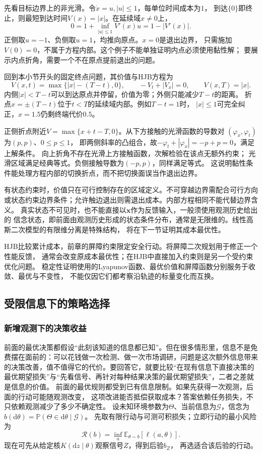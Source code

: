 先看目标边界上的非光滑。令$\dot x=u,|u|\leq1$，每单位时间成本为$1$，
到达$\{0\}$即终止，则最短到达时间$V(x)=|x|$。在延续域$x\neq0$上，
\[
  0=1+\inf_{|u|\leq1}V'(x)u=1-|V'(x)|.
\]
正侧取$u=-1$、负侧取$u=1$，均推向原点。$x=0$是退出边界，
只需施加$V(0)=0$，不属于方程内部。这个例子不能单独证明内点必须使用黏性解；
要展示内点折角，需要一个不在原点提前退出的问题。

\begin{example}[延续域内部的价值折点]
\label{ex:control-viscosity-interior-kink}
回到本小节开头的固定终点问题，其价值与HJB方程为
\[
  V(x,t)=\max\{|x|-(T-t),0\},\qquad
  -V_t+|V_x|=0,\qquad V(x,T)=|x|.
\]
内侧$|x|<T-t$可以到达原点并停留，价值为零；外侧只能减少$T-t$的距离。
折点$x=\pm(T-t)$位于$t<T$的延续域内部。例如$T-t=1$时，
$|x|\leq1$可完全纠正，$x=1.5$仍剩终端代价$0.5$。

正侧折点附近$V=\max\{x+t-T,0\}$。从下方接触的光滑函数的导数对
$(\varphi_x,\varphi_t)$为$(p,p)$、$0\leq p\leq1$，
即两侧斜率的凸组合，故$-\varphi_t+|\varphi_x|=-p+p=0$，满足上解条件。
向上折角不存在光滑上方接触函数，次解检验在该点无额外约束；
光滑区域满足经典等式。负侧接触导数为$(-p,p)$，同样满足等式。
这说明黏性条件能处理方程内部的切换折点，而不把切换面误当作退出边界。
\end{example}

有状态约束时，价值只在可行控制存在的区域定义。不可穿越边界需配合可行方向
或状态约束边界条件；允许触边退出则需退出成本。内部方程相同不能代替边界含义。
真实状态不可见时，也不能直接以$\bm x$作为反馈输入，一般须使用观测历史给出的
信念状态，即前面由观测历史形成的状态条件分布，通常是无限维的。线性高斯二次模型的有限维分离是特殊结构，
将在下一节证明其成本最优性。

HJB比较累计成本，前章的屏障约束限定安全行动。将屏障二次规划用于修正一个性能反馈，
通常会改变原成本最优性；在HJB中直接加入约束则是另一个受约束优化问题。
稳定性证明使用的Lyapunov函数、最优价值和屏障函数分别服务于收敛、最优与不变性，
不能仅因它们都考察沿轨迹的标量变化而互换。

\subsection{受限信息下的策略选择}
\label{sec:decision-value-of-information}

\subsubsection{新增观测下的决策收益}

前面的最优决策都假设“此刻该知道的信息都已知”。但在很多情形里，信息不是免费摆在面前的：可以花钱做一次检测、做一次市场调研，问题是这次额外信息带来的决策改善，值不值得它的代价。要回答它，就要比较“在现有信息下直接决策的最优期望损失”与“先看信号、再针对每种结果决策的最优期望损失”，二者之差就是信息的价值。
前面的最优规则都受到已有信息限制。如果先获得一次观测，后面的行动可能随观测改变，
这项改进能否抵偿获取成本？答案依赖任务损失，不只依赖观测减少了多少不确定性。
设未知环境参数为$\Theta$、当前信息为$\mathcal G$，信念为
$b(\mathrm d\theta)=\mathbb P(\Theta\in\mathrm d\theta\mid\mathcal G)$。
先取有限行动与可测可积损失；立即行动的最小风险为
\[
  \mathcal R(b)=\inf_a\mathbb E_{\theta\sim b}[\ell(a,\theta)].
\]
现在可先从给定核$K(\mathrm dz\mid\theta)$观察信号$Z$，得到后验$b_Z$，
再选适合该后验的行动。

